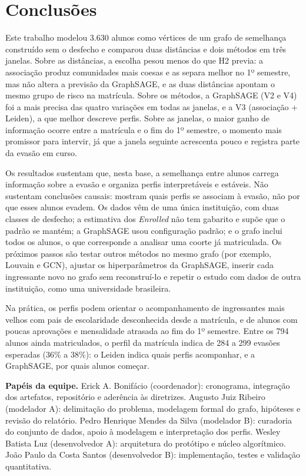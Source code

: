 \section{Conclusões}
\label{conclusoes}

Este trabalho modelou 3.630 alunos como vértices de um grafo de semelhança construído sem o desfecho e comparou duas distâncias e dois métodos em três janelas. Sobre as distâncias, a escolha pesou menos do que H2 previa: a associação produz comunidades mais coesas e as separa melhor no 1º semestre, mas não altera a previsão da GraphSAGE, e as duas distâncias apontam o mesmo grupo de risco na matrícula. Sobre os métodos, a GraphSAGE (V2 e V4) foi a mais precisa das quatro variações em todas as janelas, e a V3 (associação + Leiden), a que melhor descreve perfis. Sobre as janelas, o maior ganho de informação ocorre entre a matrícula e o fim do 1º semestre, o momento mais promissor para intervir, já que a janela seguinte acrescenta pouco e registra parte da evasão em curso.

Os resultados sustentam que, nesta base, a semelhança entre alunos carrega informação sobre a evasão e organiza perfis interpretáveis e estáveis. Não sustentam conclusões causais: mostram quais perfis se associam à evasão, não por que esses alunos evadem. Os dados vêm de uma única instituição, com duas classes de desfecho; a estimativa dos \textit{Enrolled} não tem gabarito e supõe que o padrão se mantém; a GraphSAGE usou configuração padrão; e o grafo inclui todos os alunos, o que corresponde a analisar uma coorte já matriculada. Os próximos passos são testar outros métodos no mesmo grafo (por exemplo, Louvain e GCN), ajustar os hiperparâmetros da GraphSAGE, inserir cada ingressante novo no grafo sem reconstruí-lo e repetir o estudo com dados de outra instituição, como uma universidade brasileira.

Na prática, os perfis podem orientar o acompanhamento de ingressantes mais velhos com pais de escolaridade desconhecida desde a matrícula, e de alunos com poucas aprovações e mensalidade atrasada ao fim do 1º semestre. Entre os 794 alunos ainda matriculados, o perfil da matrícula indica de 284 a 299 evasões esperadas (36\% a 38\%): o Leiden indica quais perfis acompanhar, e a GraphSAGE, por quais alunos começar.

\textbf{Papéis da equipe.} Erick A. Bonifácio (coordenador): cronograma, integração dos artefatos, repositório e aderência às diretrizes. Augusto Juiz Ribeiro (modelador A): delimitação do problema, modelagem formal do grafo, hipóteses e revisão do relatório. Pedro Henrique Mendes da Silva (modelador B): curadoria do conjunto de dados, apoio à modelagem e interpretação dos perfis. Wesley Batista Luz (desenvolvedor A): arquitetura do protótipo e núcleo algorítmico. João Paulo da Costa Santos (desenvolvedor B): implementação, testes e validação quantitativa.
